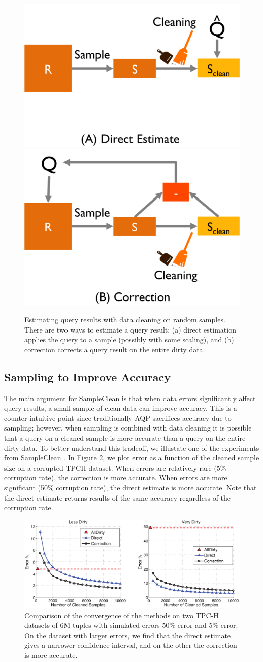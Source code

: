 \begin{figure}\centering
\includegraphics[width=.3\columnwidth]{figs/est1b.png}
\hspace{2em}
\includegraphics[width=.3\columnwidth]{figs/est1c.png}
\caption{Estimating query results with data cleaning on random samples. There are two ways to estimate a query result: (a) direct estimation applies the query to a sample (possibly with some scaling), and (b) correction corrects a query result on the entire dirty data.\label{fig:est}}
\end{figure}

\subsection{Sampling to Improve Accuracy}
The main argument for SampleClean is that when data errors significantly affect query results, a small sample of clean data can improve accuracy.
This is a counter-intuitive point since traditionally AQP sacrifices accuracy due to sampling; however, when sampling is combined with data cleaning it is possible that a query on a cleaned sample is more accurate than a query on the entire dirty data.
To better understand this tradeoff, we illustate one of the experiments from SampleClean \cite{wang1999sample}.
In Figure \ref{fig:est2}, we plot error as a function of the cleaned sample size on a corrupted TPCH dataset.
When errors are relatively rare (5\% corruption rate), the correction is more accurate. 
When errors are more significant (50\% corruption rate), the direct estimate is more accurate.
Note that the direct estimate returns results of the same accuracy regardless of the corruption rate. 

\begin{figure}
\includegraphics[width=.6\columnwidth]{figs/allerror-samplesize.eps}
\caption{Comparison of the convergence of the methods on two TPC-H datasets of 6M tuples with simulated errors 50\% error and 5\% error. On the dataset with larger errors, we find that the direct estimate gives a narrower confidence interval, and on the other the correction is more accurate.  \label{fig:est2}}
\end{figure}



